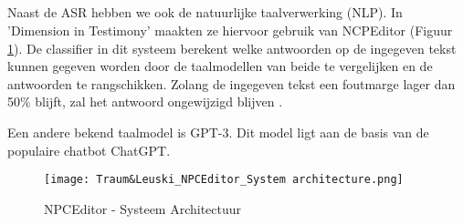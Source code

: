\subsection{} \label{ssec:Natuurlijke taalverwerking}%

Naast de ASR hebben we ook de natuurlijke taalverwerking (NLP). In 'Dimension in Testimony' maakten ze hiervoor gebruik van NCPEditor (Figuur \ref{fig:NPCEArchitecture}). De classifier in dit systeem berekent welke antwoorden op de ingegeven tekst kunnen gegeven worden door de taalmodellen van beide te vergelijken en de antwoorden te rangschikken. Zolang de ingegeven tekst een foutmarge lager dan 50\% blijft, zal het antwoord ongewijzigd blijven \autocite{Leuski2010}.

Een andere bekend taalmodel is GPT-3. Dit model ligt aan de basis van de populaire chatbot ChatGPT.

\begin{figure}[h]
    \centering
    \texttt{[image: Traum\&Leuski\_NPCEditor\_System architecture.png]}
    \caption{NPCEditor - Systeem Architectuur \autocite{Leuski2010}}
    \label{fig:NPCEArchitecture}
\end{figure}

%
%
%
